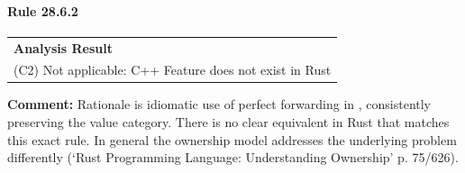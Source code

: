 \paragraph{Rule 28.6.2}
\begin{longtable}{p{13cm}}
\textbf{Analysis Result} \\
(C2) Not applicable: C++ Feature does not exist in Rust \\
\end{longtable}
\textbf{Comment:} Rationale is idiomatic use of perfect forwarding in \Cpp, consistently preserving the value category. There is no clear equivalent in Rust that matches this exact rule. In general the ownership model addresses the underlying problem differently (`Rust Programming Language: Understanding Ownership' p. 75/626). \\
